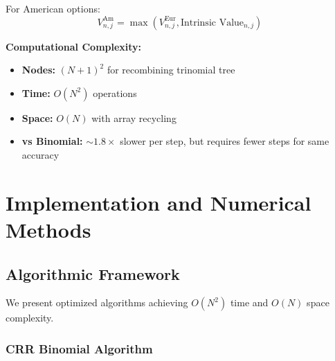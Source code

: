 \documentclass[10pt,twocolumn]{article}
\begin{document}
For American options:
\begin{equation}
V_{n,j}^{\text{Am}} = \max\left(V_{n,j}^{\text{Eur}}, \text{Intrinsic Value}_{n,j}\right)
\end{equation}

\begin{resultbox}
\textbf{Computational Complexity:}
\begin{itemize}[itemsep=1pt]
    \item \textbf{Nodes:} $(N+1)^2$ for recombining trinomial tree
    \item \textbf{Time:} $O(N^2)$ operations
    \item \textbf{Space:} $O(N)$ with array recycling
    \item \textbf{vs Binomial:} $\sim 1.8\times$ slower per step, but requires fewer steps for same accuracy
\end{itemize}
\end{resultbox}

\section{Implementation and Numerical Methods}

\subsection{Algorithmic Framework}

We present optimized algorithms achieving $O(N^2)$ time and $O(N)$ space complexity.

\subsubsection{CRR Binomial Algorithm}
\end{document}
